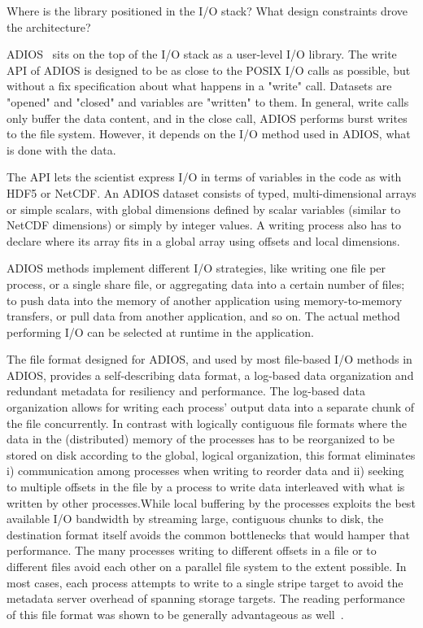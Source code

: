 {\color {red}Where is the library positioned in the I/O stack? What design constraints drove the architecture?}

ADIOS~\cite{ADIOS:Lofstead:ipdps09} sits on the top of the I/O stack as a user-level I/O library. The write API of ADIOS is designed to be as close to the POSIX I/O calls as possible, but without a fix specification about what happens in a "write" call. Datasets are "opened" and "closed" and variables are "written" to them. In general, write calls only buffer the data content, and in the close call, ADIOS performs burst writes to the file system. However, it depends on the I/O method used in ADIOS, what is done with the data.

The API lets the scientist express I/O in terms of variables in the code as with HDF5 or NetCDF. An ADIOS dataset consists of typed, multi-dimensional arrays or simple scalars, with global dimensions defined by scalar variables (similar to NetCDF dimensions) or simply by integer values. A writing process also has to declare where its array fits in a global array using offsets and local dimensions.

ADIOS methods implement different I/O strategies, like writing one file per process, or a single share file, or aggregating data into a certain number of files; to push data into the memory of another application using memory-to-memory transfers, or pull data from another application, and so on. The actual method performing I/O can be selected at runtime in the application. 

The file format designed for ADIOS, and used by most file-based I/O methods in ADIOS, provides a self-describing data format, a log-based data organization and redundant metadata for resiliency and performance. The log-based data organization allows for writing each process' output data into a separate chunk of the file concurrently. In contrast with logically contiguous file formats where the data in the (distributed) memory of the processes has to be reorganized to be stored on disk according to the global, logical organization, this format eliminates i) communication among processes when writing to reorder data and ii) seeking to multiple offsets in the file by a process to write data interleaved with what is written by other processes.While local buffering by the processes exploits the best available I/O bandwidth by streaming large, contiguous chunks to disk, the destination format itself avoids the common bottlenecks that would hamper that performance. The many processes writing to different offsets in a file or to different files avoid each other on a parallel file system to the extent possible. In most cases, each process attempts to write to a single stripe target to avoid the metadata server overhead of spanning storage targets. The reading performance of this file format was shown to be generally advantageous as well~\cite{ADIOS:Lofstead:hpdc11}.




